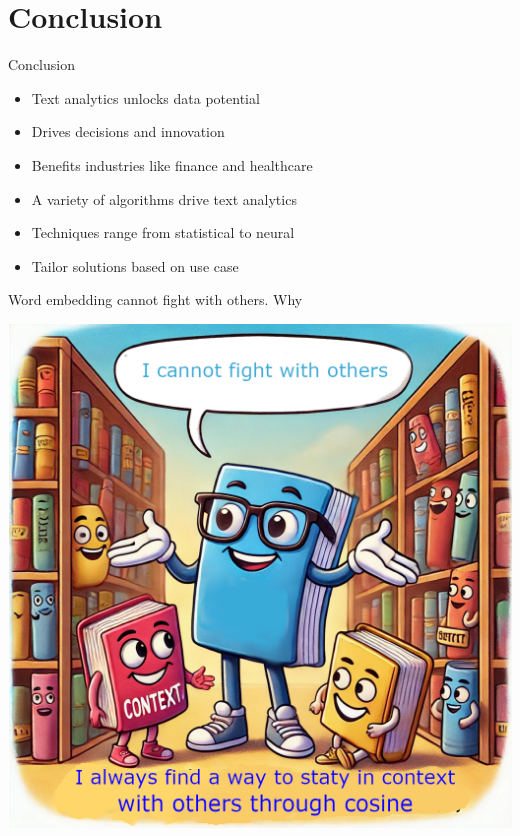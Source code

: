 \section{Conclusion}
\begin{frame}{Conclusion}
\begin{itemize}
    \item Text analytics unlocks data potential
    \item Drives decisions and innovation
    \item Benefits industries like finance and healthcare
    \item A variety of algorithms drive text analytics
    \item Techniques range from statistical to neural
    \item Tailor solutions based on use case
\end{itemize}
\end{frame}
\begin{frame}{Word embedding cannot fight with others. Why}
\begin{center}
	\includegraphics[width=0.55\linewidth]{Images/TAJoke1}
\end{center}

\end{frame}


